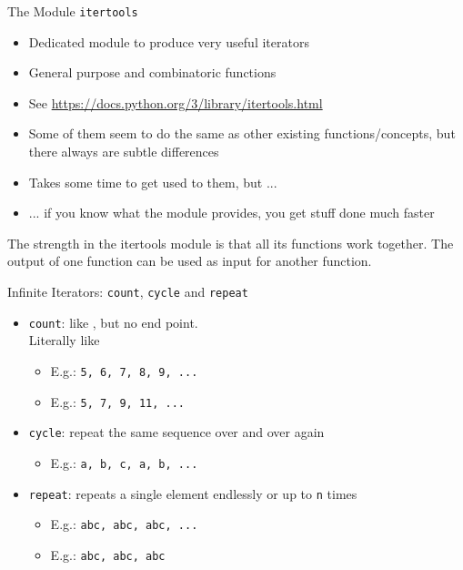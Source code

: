 
\begin{frame}{The Module \texttt{itertools}}
%
\begin{itemize}
\item Dedicated module to produce very useful iterators
\item General purpose and combinatoric functions
\item See \url{https://docs.python.org/3/library/itertools.html}
\item Some of them seem to do the same as other existing functions/concepts, but there always are subtle differences
\item Takes some time to get used to them, but ...
\item ... if you know what the module provides, you get stuff done much faster
\end{itemize}
%
\begin{hintbox}
\small
The strength in the itertools module is that all its functions work together. The output of one function can be used as input for another function.
\end{hintbox}
%
\end{frame}


\begin{frame}{Infinite Iterators: \texttt{count}, \texttt{cycle} and \texttt{repeat}}
%
\begin{itemize}
\item \texttt{count}: like , but no end point.\\
	Literally like 
	\begin{itemize}
	\item E.\;g.:  \thus \texttt{5, 6, 7, 8, 9, ...}
	\item E.\;g.:  \thus \texttt{5, 7, 9, 11, ...}
	\end{itemize}
\item \texttt{cycle}: repeat the same sequence over and over again
	\begin{itemize}
	\item E.\;g.:  \thus \texttt{a, b, c, a, b, ...}
	\end{itemize}
\item \texttt{repeat}: repeats a single element endlessly or up to \texttt{n} times
	\begin{itemize}
	\item E.\;g.:  \thus \texttt{abc, abc, abc, ...}
	\item E.\;g.:  \thus \texttt{abc, abc, abc}
	\end{itemize}
\end{itemize}
%
\end{frame}

